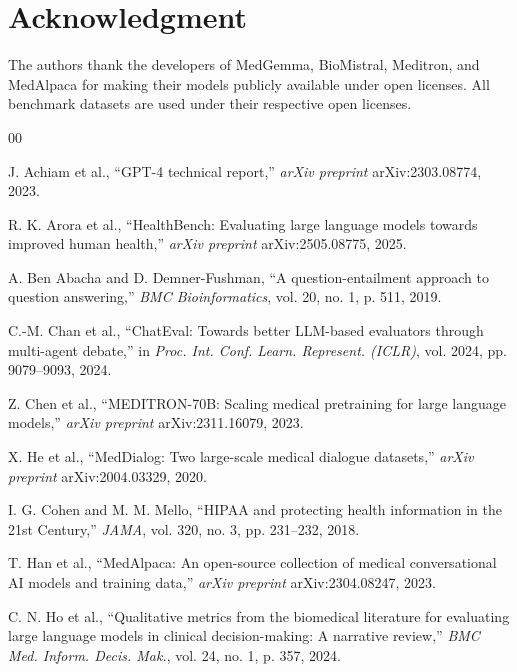 \documentclass[conference]{IEEEtran}
\begin{document}
\section*{Acknowledgment}

The authors thank the developers of MedGemma, BioMistral, Meditron,
and MedAlpaca for making their models publicly available under open
licenses. All benchmark datasets are used under their respective
open licenses.

\begin{thebibliography}{00}

J. Achiam et al., ``GPT-4 technical report,'' \textit{arXiv preprint}
arXiv:2303.08774, 2023.

R. K. Arora et al., ``HealthBench: Evaluating large language models
towards improved human health,'' \textit{arXiv preprint}
arXiv:2505.08775, 2025.

A. Ben Abacha and D. Demner-Fushman, ``A question-entailment approach
to question answering,'' \textit{BMC Bioinformatics}, vol. 20, no. 1,
p. 511, 2019.

C.-M. Chan et al., ``ChatEval: Towards better LLM-based evaluators
through multi-agent debate,'' in \textit{Proc. Int. Conf. Learn.
Represent. (ICLR)}, vol. 2024, pp. 9079--9093, 2024.

Z. Chen et al., ``MEDITRON-70B: Scaling medical pretraining for large
language models,'' \textit{arXiv preprint} arXiv:2311.16079, 2023.

X. He et al., ``MedDialog: Two large-scale medical dialogue datasets,''
\textit{arXiv preprint} arXiv:2004.03329, 2020.

I. G. Cohen and M. M. Mello, ``HIPAA and protecting health information
in the 21st Century,'' \textit{JAMA}, vol. 320, no. 3,
pp. 231--232, 2018.

T. Han et al., ``MedAlpaca: An open-source collection of medical
conversational AI models and training data,'' \textit{arXiv preprint}
arXiv:2304.08247, 2023.

C. N. Ho et al., ``Qualitative metrics from the biomedical literature
for evaluating large language models in clinical decision-making:
A narrative review,'' \textit{BMC Med. Inform. Decis. Mak.},
vol. 24, no. 1, p. 357, 2024.


\end{thebibliography}
\end{document}
